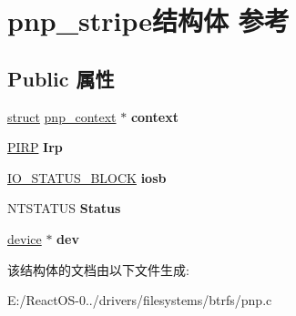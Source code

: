 \hypertarget{structpnp__stripe}{}\section{pnp\+\_\+stripe结构体 参考}
\label{structpnp__stripe}
\subsection*{Public 属性}
\begin{DoxyCompactItemize}
\item 
\mbox{\label{structpnp__stripe_aecf37ac06aeb2d5bad2b25f75b225ffb}} 
\hyperlink{interfacestruct}{struct} \hyperlink{structpnp__context}{pnp\+\_\+context} $\ast$ {\bfseries context}
\item 
\mbox{\label{structpnp__stripe_a7ef1ed096b633d56e44a49aa4445c9a9}} 
\hyperlink{interfacevoid}{P\+I\+RP} {\bfseries Irp}
\item 
\mbox{\label{structpnp__stripe_ae7e15b092b73aceca05078196ae45d39}} 
\hyperlink{struct___i_o___s_t_a_t_u_s___b_l_o_c_k}{I\+O\+\_\+\+S\+T\+A\+T\+U\+S\+\_\+\+B\+L\+O\+CK} {\bfseries iosb}
\item 
\mbox{\label{structpnp__stripe_afad0dac9e22f2a4f54a5526a78c0732a}} 
N\+T\+S\+T\+A\+T\+US {\bfseries Status}
\item 
\mbox{\label{structpnp__stripe_a115ea4a5300b10d3915df3924a59df67}} 
\hyperlink{structdevice}{device} $\ast$ {\bfseries dev}
\end{DoxyCompactItemize}


该结构体的文档由以下文件生成\+:\begin{DoxyCompactItemize}
\item 
E\+:/\+React\+O\+S-\/0../drivers/filesystems/btrfs/pnp.\+c\end{DoxyCompactItemize}
